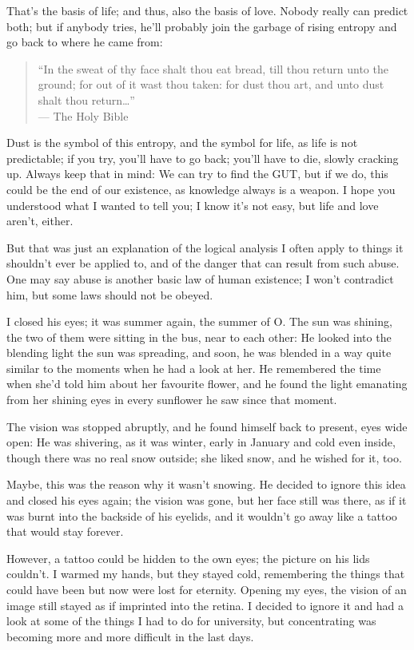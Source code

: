 That's the basis of life; and thus, also the basis of love. 
Nobody really can predict both; but if anybody tries, he'll probably join the garbage of rising entropy and go back to where he came from:
\begin{quote}
\enquote{In the sweat of thy face shalt thou eat bread, till thou return unto the ground; for out of it wast thou taken: for dust thou art, and unto dust shalt thou return\dots{}}\\
--- The Holy Bible
\end{quote}
Dust is the symbol of this entropy, and the symbol for life, as life is not predictable; if you try, you'll have to go back; you'll have to die, slowly cracking up. 
Always keep that in mind: We can try to find the GUT, but if we do, this could be the end of our existence, as knowledge always is a weapon. 
I hope you understood what I wanted to tell you; I know it's not easy, but life and love aren't, either.

But that was just an explanation of the logical analysis I often apply to things it shouldn't ever be applied to, and of the danger that can result from such abuse. 
One may say abuse is another basic law of human existence; I won't contradict him, but some laws should not be obeyed.

I closed his eyes; it was summer again, the summer of O. The sun was shining, the two of them were sitting in the bus, near to each other: He looked into the blending light the sun was spreading, and soon, he was blended in a way quite similar to the moments when he had a look at her. He remembered the time when she'd told him about her favourite flower, and he found the light emanating from her shining eyes in every sunflower he saw since that moment.

The vision was stopped abruptly, and he found himself back to present, eyes wide open: He was shivering, as it was winter, early in January and cold even inside, though there was no real snow outside; she liked snow, and he wished for it, too.

Maybe, this was the reason why it wasn't snowing. 
He decided to ignore this idea and closed his eyes again; the vision was gone, but her face still was there, as if it was burnt into the backside of his eyelids, and it wouldn't go away like a tattoo that would stay forever.

However, a tattoo could be hidden to the own eyes; the picture on his lids couldn't. 
I warmed my hands, but they stayed cold, remembering the things that could have been but now were lost for eternity. 
Opening my eyes, the vision of an image still stayed as if imprinted into the retina. I decided to ignore it and had a look at some of the things I had to do for university, but concentrating was becoming more and more difficult in the last days.

